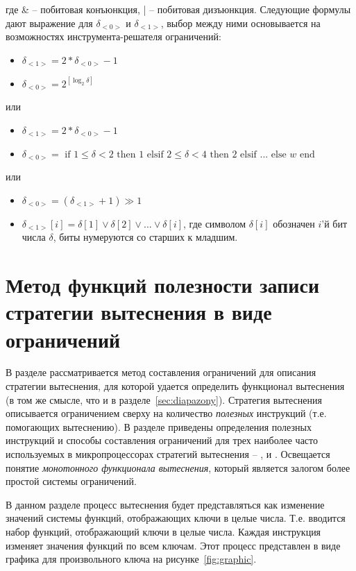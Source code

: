 где \& -- побитовая конъюнкция, | -- побитовая дизъюнкция. Следующие формулы дают выражение для $\delta_{<0>}$ и $\delta_{<1>}$, выбор между ними основывается на возможностях инструмента-решателя ограничений:
\begin{itemize}
    \item $\delta_{<1>} = 2 * \delta_{<0>} - 1$
    \item $\delta_{<0>} = 2^{[\log_2 \delta]}$
\end{itemize}
или
\begin{itemize}
    \item $\delta_{<1>} = 2 * \delta_{<0>} - 1$
    \item $\delta_{<0>} = \mbox{~if~} 1 \leqslant \delta < 2 \mbox{~then~} 1 \mbox{~elsif~} 2 \leqslant \delta < 4 \mbox{~then~} 2 \mbox{~elsif~} ... \mbox{~else~} w \mbox{~end~}$
\end{itemize}
или
\begin{itemize}
    \item $\delta_{<0>} = (\delta_{<1>} + 1) \gg 1$
    \item $\delta_{<1>}[i] = \delta[1] \vee \delta[2] \vee ... \vee \delta[i]$, где символом $\delta[i]$ обозначен $i$'й бит числа $\delta$, биты нумеруются со старших к младшим.
\end{itemize}




\section{Метод функций полезности записи стратегии вытеснения в виде ограничений}\label{sec:usefulness_functions}

{\footnotesize В разделе рассматривается метод составления ограничений для
описания стратегии вытеснения, для которой удается определить функционал
вытеснения (в том же смысле, что и в разделе~\ref{sec:diapazony}). Стратегия вытеснения описывается ограничением сверху на количество \emph{полезных} инструкций (т.е. помогающих вытеснению).
В разделе приведены определения полезных инструкций и способы составления ограничений для трех
наиболее часто используемых в микропроцессорах стратегий вытеснения -- \LRU, \FIFO и \PseudoLRU. Освещается понятие \emph{монотонного функционала вытеснения}, который является залогом более
простой системы ограничений.}

В данном разделе процесс вытеснения будет представляться как изменение значений
системы функций, отображающих ключи в целые числа. Т.е. вводится набор функций,
отображающий ключи в целые числа. Каждая инструкция изменяет значения функций по
всем ключам. Этот процесс представлен в виде графика для произвольного ключа на рисунке~\ref{fig:graphic}.

